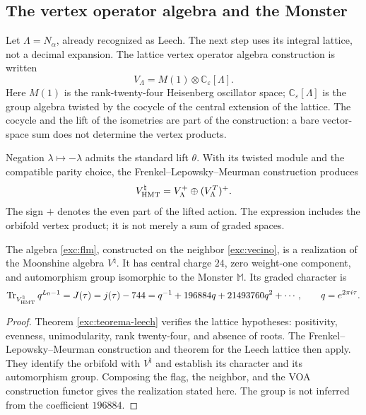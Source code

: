 \subsection{The vertex operator algebra and the Monster}
\label{exc:voa}

Let $\Lambda=N_\alpha$, already recognized as Leech. The next step
uses its integral lattice, not a decimal expansion. The lattice
vertex operator algebra construction is written
\[
 V_\Lambda=M(1)\otimes\mathbb C_\varepsilon[\Lambda].
\]
Here $M(1)$ is the rank-twenty-four Heisenberg oscillator
space; $\mathbb C_\varepsilon[\Lambda]$ is the group algebra
twisted by the cocycle of the central extension of the lattice. The
cocycle and the lift of the isometries are part of the
construction: a bare vector-space sum does not determine the vertex
products.

Negation $\lambda\mapsto-\lambda$ admits the standard lift
$\theta$. With its twisted module and the compatible parity choice,
the Frenkel--Lepowsky--Meurman construction produces
\begin{equation}
 V^\natural_{\rm HMT}
   =V_\Lambda^+\oplus(V_\Lambda^T)^+.
 \label{exc:flm}
\end{equation}
The sign $+$ denotes the even part of the lifted action. The expression
includes the orbifold vertex product; it is not merely a sum
of graded spaces.

\begin{theorem}
\label{exc:moonshine}
The algebra \eqref{exc:flm}, constructed on the neighbor
\eqref{exc:vecino}, is a realization of the Moonshine algebra
$V^\natural$. It has central charge $24$, zero weight-one component,
and automorphism group isomorphic to the Monster $\mathbb M$. Its graded
character is
\begin{equation}
 \operatorname{Tr}_{V^\natural_{\rm HMT}}q^{L_0-1}
   =J(\tau)=j(\tau)-744
   =q^{-1}+196884q+21493760q^2+\cdots,
 \qquad q=e^{2\pi i\tau}.
 \label{exc:j}
\end{equation}
\end{theorem}

\begin{proof}
Theorem \ref{exc:teorema-leech} verifies the lattice hypotheses:
positivity, evenness, unimodularity, rank twenty-four, and absence of
roots. The Frenkel--Lepowsky--Meurman construction and theorem
for the Leech lattice then apply. They identify
the orbifold with $V^\natural$ and establish its character and its
automorphism group. Composing the flag, the neighbor, and the VOA
construction functor gives the realization stated here. The group is not inferred
from the coefficient $196884$.
\end{proof}

